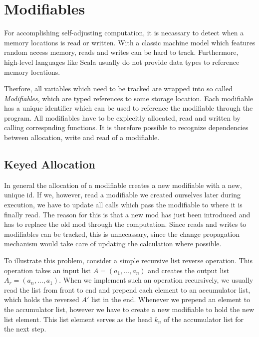 \section{Modifiables}


For accomplishing self-adjusting computation, it is necassary to detect when a memory locations is read or written. With a classic machine model which features random access memory, reads and writes can be hard to track. Furthermore, high-level languages like Scala usually do not provide data types to reference memory locations. 

Therfore, all variables which need to be tracked are wrapped into so called \textit{Modifiables}, which are typed references to some storage location. Each modifiable has a unique identifier which can be used to reference the modifiable through the program. All modifiables have to be explecitly allocated, read and written by calling correspnding functions. It is therefore possible to recognize dependencies between allocation, write and read of a modifiable. 

\subsection{Keyed Allocation}
\label{sec:keyed_alloc}

In general the allocation of a modifiable creates a new modifiable with a new, unique id. If we, however, read a modifiable we created ourselves later during execution, we have to update all calls which pass the modifiable to where it is finally read. The reason for this is that a new mod has just been introduced and has to replace the old mod through the computation. Since reads and writes to modifiables can be tracked, this is unnecassary, since the change propagation mechanism would take care of updating the calculation where possible. 

To illustrate this problem, consider a simple recursive list reverse operation. This operation takes an input list $A = (a_1, ..., a_n)$ and creates the output list $A_r = (a_n, ..., a_1)$. When we implement such an operation recursively, we usually read the list from front to end and prepend each element to an accumulator list, which holds the reversed $A'$ list in the end. Whenever we prepend an element to the accumulator list, however we have to create a new modifiable to hold the new list element. This list element serves as the head $k_n$ of the accumulator list for the next step.  

